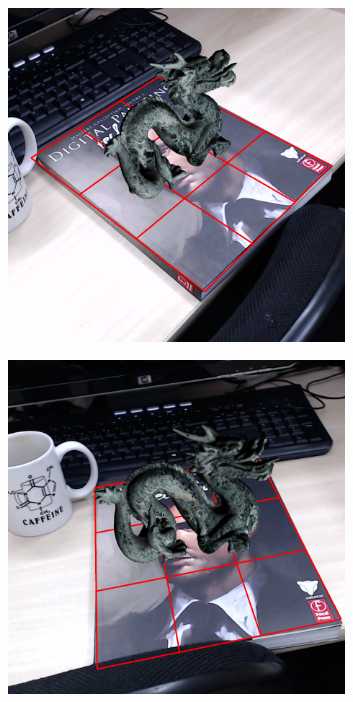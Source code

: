 \documentclass[annual]{acmsiggraph}
\begin{document}
\begin{figure}[t]
	\center
	\begin{subfigure}[c]{0.2\textwidth} \includegraphics[width=0.98\textwidth]{images/res_web1_cut1.png} \end{subfigure}%
	\begin{subfigure}[c]{0.2\textwidth} \includegraphics[width=0.98\textwidth]{images/res_web1_cut2.png} \end{subfigure}%

\end{figure}
\end{document}
